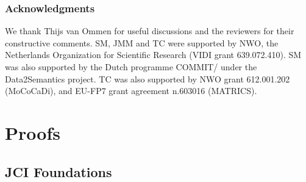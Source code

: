 \documentclass[twoside,11pt]{article}
\begin{document}
\subsubsection*{Acknowledgments}
We thank Thijs van Ommen for useful discussions and the reviewers for their constructive comments.
SM, JMM and TC were supported by NWO, the Netherlands Organization for Scientific Research (VIDI grant 639.072.410). SM was also supported by the Dutch programme COMMIT/ under the Data2Semantics project.
%
TC was also supported by NWO grant 612.001.202 (MoCoCaDi), and EU-FP7 grant agreement n.603016 (MATRICS).



{}
\appendix

\section{Proofs}\label{sec:app:proofs}

\subsection{JCI Foundations}
\end{document}
